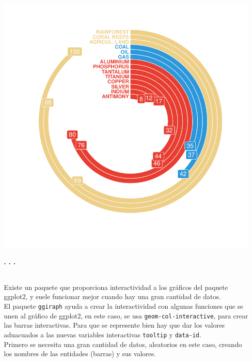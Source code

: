 \documentclass{article}\usepackage[]{graphicx}\usepackage[]{color}
\makeatletter
\def\maxwidth{ %
  \ifdim\Gin@nat@width>\linewidth
    \linewidth
  \else
    \Gin@nat@width
  \fi
}
\newenvironment{knitrout}{}{} %
\makeatother
\begin{document}
\begin{knitrout}
\color{fgcolor}

{\centering \includegraphics[width=\maxwidth]{figure/plot_br_final-1} 

}



\end{knitrout}
\begin{center}
\textbf{. . .}
\end{center}
~\\Existe un paquete que proporciona interactividad a los gr\'aficos del paquete ggplot2, y suele funcionar mejor cuando hay una gran cantidad de datos.~\\
El paquete \texttt{ggiraph}\cite{docu_ggiraph}
ayuda a crear la interactividad con algunas funciones que se unen al gr\'afico de ggplot2, en este caso, se usa \texttt{geom-col-interactive}, para crear las barras interactivas. Para que se represente bien hay que dar los valores aduacuados a las nuevas variables interactivas \texttt{tooltip} y \texttt{data-id}.~\\
Primero se necesita una gran cantidad de datos, aleatorios en este caso, creando los nombres de las entidades (barras) y sus valores.
\end{document}
